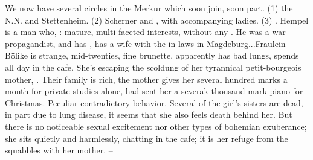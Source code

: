 We now have several circles in the Merkur which soon join, soon part. (1) the N.N. and Stettenheim. (2) Scherner and , with accompanying ladies. (3) . Hempel is a man who, : mature, multi-faceted interests, without any . He was a war propagandist, and has , has a wife with the in-laws in Magdeburg...Fraulein Bölike is strange, mid-twenties, fine brunette, apparently has bad lungs, spends all day in the cafe. She's escaping the scoldung of her tyrannical petit-bourgeois mother, . Their family is rich, the mother gives her several hundred marks a month for private studies alone, had sent her a severak-thousand-mark piano for Christmas. Peculiar contradictory behavior. Several of the girl's sisters are dead, in part due to lung disease, it seems that she also feels death behind her. But there is no noticeable sexual excitement nor other types of bohemian exuberance; she sits quietly and harmlessly, chatting in the cafe; it is her refuge from the squabbles with her mother. --

